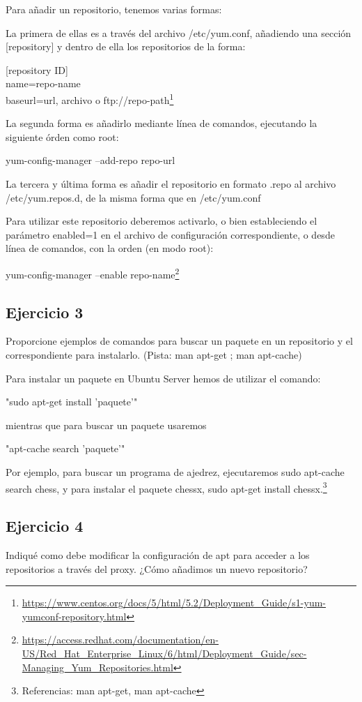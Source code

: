 \documentclass[a4paper, 11pt]{article} %
\begin{document}
Para añadir un repositorio, tenemos varias formas: 

	La primera de ellas es a través del archivo /etc/yum.conf, añadiendo una sección [repository] y dentro de ella los repositorios de la forma: 

	[repository ID]\\
	name=repo-name\\
	baseurl=url, archivo o ftp://repo-path\footnote{\url{https://www.centos.org/docs/5/html/5.2/Deployment_Guide/s1-yum-yumconf-repository.html}}
	
	La segunda forma es añadirlo mediante línea de comandos, ejecutando la siguiente órden como root: 
	
	yum-config-manager --add-repo repo-url

	La tercera y última forma es añadir el repositorio en formato .repo al archivo /etc/yum.repos.d, de la misma forma que en /etc/yum.conf 
	
	Para utilizar este repositorio deberemos activarlo, o bien estableciendo el parámetro enabled=1 en el archivo de configuración correspondiente, o desde línea de comandos, con la orden (en modo root):
	
	yum-config-manager --enable repo-name\footnote{\url{https://access.redhat.com/documentation/en-US/Red_Hat_Enterprise_Linux/6/html/Deployment_Guide/sec-Managing_Yum_Repositories.html}} 
	

\subsection{Ejercicio 3}
Proporcione ejemplos de comandos para buscar un paquete en un
repositorio y el correspondiente para instalarlo. (Pista: man apt-get ; man apt-cache)

Para instalar un paquete en Ubuntu Server hemos de utilizar el comando: 

"sudo apt-get install 'paquete'" 

mientras que para buscar un paquete usaremos 

"apt-cache search 'paquete'" 

Por ejemplo, para buscar un programa de ajedrez, ejecutaremos sudo apt-cache search chess, y para instalar el paquete chessx, sudo apt-get install chessx.\footnote{Referencias: man apt-get, man apt-cache}

\subsection{Ejercicio 4}
Indiqué como debe modificar la configuración de apt para acceder a los repositorios a través del proxy. ¿Cómo añadimos un nuevo repositorio?
\end{document}

